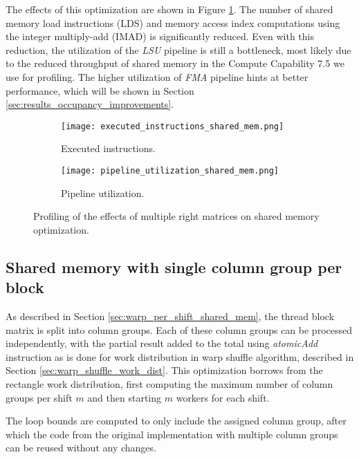 
The effects of this optimization are shown in Figure \ref{fig:shared_memory_multimat_right_profiling}. The number of shared memory load instructions (LDS) and memory access index computations using the integer multiply-add (IMAD) is significantly reduced. Even with this reduction, the utilization of the \textit{LSU} pipeline is still a bottleneck, most likely due to the reduced throughput of shared memory in the Compute Capability 7.5 we use for profiling. The higher utilization of \textit{FMA} pipeline hints at better performance, which will be shown in Section \ref{sec:results_occupancy_improvements}.


\begin{figure}[ht]
	\centering	
	\begin{subfigure}{0.8\textwidth}
		\centering
		\texttt{[image: executed\_instructions\_shared\_mem.png]}
		\caption{Executed instructions.}
	\end{subfigure}
	\hfill
	\begin{subfigure}{0.8\textwidth}
		\centering
		\texttt{[image: pipeline\_utilization\_shared\_mem.png]}
		\caption{Pipeline utilization.}
	\end{subfigure}
	
	\caption{Profiling of the effects of multiple right matrices on shared memory optimization.}
	\label{fig:shared_memory_multimat_right_profiling}
\end{figure}

\subsection{Shared memory with single column group per block}
\label{sec:column_group_per_worker}
As described in Section \ref{sec:warp_per_shift_shared_mem}, the thread block matrix is split into column groups. Each of these column groups can be processed independently, with the partial result added to the total using \textit{atomicAdd} instruction as is done for work distribution in warp shuffle algorithm, described in Section \ref{sec:warp_shuffle_work_dist}. This optimization borrows from the rectangle work distribution, first computing the maximum number of column groups per shift $m$ and then starting $m$ workers for each shift.


The loop bounds are computed to only include the assigned column group, after which the code from the original implementation with multiple column groups can be reused without any changes.

